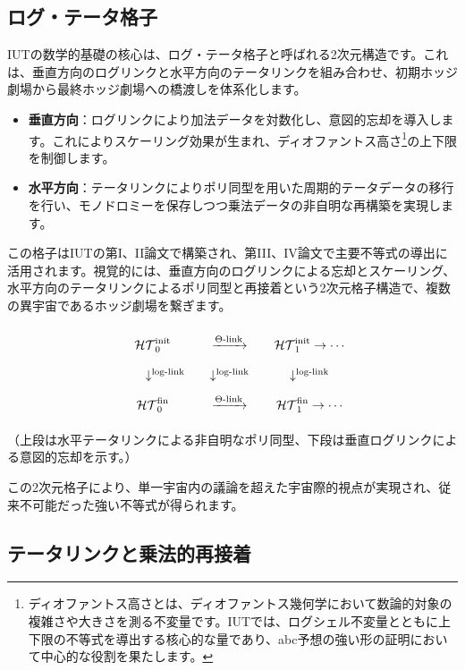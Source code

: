 \documentclass[a4paper,12pt,notitlepage]{jsreport}
\begin{document}
\subsection{ログ・テータ格子}

IUTの数学的基礎の核心は、ログ・テータ格子と呼ばれる2次元構造です。これは、垂直方向のログリンクと水平方向のテータリンクを組み合わせ、初期ホッジ劇場から最終ホッジ劇場への橋渡しを体系化します。

\begin{itemize}
  \item \textbf{垂直方向}：ログリンクにより加法データを対数化し、意図的忘却を導入します。これによりスケーリング効果が生まれ、ディオファントス高さ\footnote{ディオファントス高さとは、ディオファントス幾何学において数論的対象の複雑さや大きさを測る不変量です。IUTでは、ログシェル不変量とともに上下限の不等式を導出する核心的な量であり、abc予想の強い形の証明において中心的な役割を果たします。}の上下限を制御します。
  \item \textbf{水平方向}：テータリンクによりポリ同型を用いた周期的テータデータの移行を行い、モノドロミーを保存しつつ乗法データの非自明な再構築を実現します。
\end{itemize}

この格子はIUTの第I、II論文で構築され、第III、IV論文で主要不等式の導出に活用されます。視覚的には、垂直方向のログリンクによる忘却とスケーリング、水平方向のテータリンクによるポリ同型と再接着という2次元格子構造で、複数の異宇宙であるホッジ劇場を繋ぎます。

\[
{\renewcommand{\arraystretch}{2.0}
\setlength{\arraycolsep}{10pt}
\begin{array}{ccc}
\mathcal{HT}^{\mathrm{init}}_0 & \xrightarrow{\Theta\text{-link}} & \mathcal{HT}^{\mathrm{init}}_1 \to \cdots \\
\quad \quad \downarrow^{\text{log-link}} & \downarrow^{\text{log-link}} & \downarrow^{\text{log-link}} \\
\mathcal{HT}^{\mathrm{fin}}_0 & \xrightarrow{\Theta\text{-link}} & \mathcal{HT}^{\mathrm{fin}}_1 \to \cdots
\end{array}}
\]

（上段は水平テータリンクによる非自明なポリ同型、下段は垂直ログリンクによる意図的忘却を示す。）

この2次元格子により、単一宇宙内の議論を超えた宇宙際的視点が実現され、従来不可能だった強い不等式が得られます。

\subsection{テータリンクと乗法的再接着}
\end{document}

